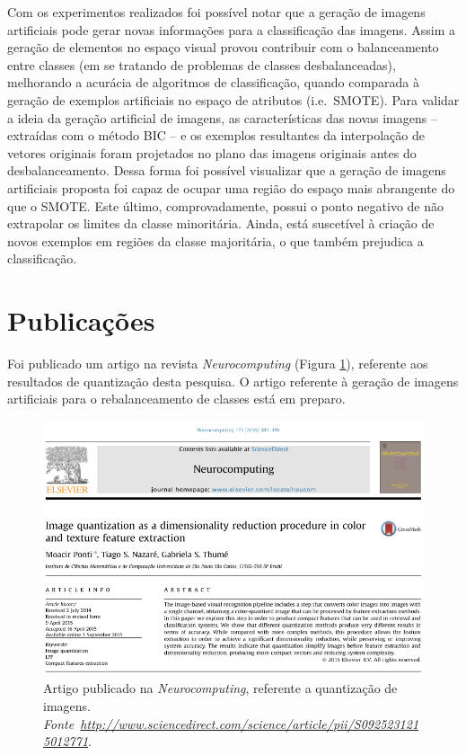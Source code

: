 Com os experimentos realizados foi possível notar que a geração de imagens artificiais pode gerar novas informações para a classificação das imagens. Assim a geração de elementos no espaço visual provou contribuir com o balanceamento entre classes (em se tratando de problemas de classes desbalanceadas), melhorando a acurácia de algoritmos de classificação, quando comparada à geração de exemplos artificiais no espaço de atributos (i.e.\ SMOTE). Para validar a ideia da geração artificial de imagens, as características das novas imagens -- extraídas com o método BIC  -- e os exemplos resultantes da interpolação de vetores originais foram projetados no plano das imagens originais antes do desbalanceamento. Dessa forma foi possível visualizar que a geração de imagens artificiais proposta foi capaz de ocupar uma região do espaço mais abrangente do que o SMOTE. Este último, comprovadamente, possui o ponto negativo de não extrapolar os limites da classe minoritária. Ainda, está suscetível à criação de novos exemplos em regiões da classe majoritária, o que também prejudica a classificação.


\section{Publicações}

Foi publicado um artigo na revista \textit{Neurocomputing} (Figura \ref{fig:artigo}), referente aos resultados de quantização desta pesquisa. O artigo referente à geração de imagens artificiais para o rebalanceamento de classes está em preparo.

\begin{figure}[hbpt]
 \begin{center}
   \includegraphics[width=\linewidth]{figuras/artigo.png}
 \end{center}
 \caption{Artigo publicado na \textit{Neurocomputing}, referente a quantização de imagens. \textit{Fonte~\url{http://www.sciencedirect.com/science/article/pii/S0925231215012771}}.}
 \label{fig:artigo}
\end{figure}

